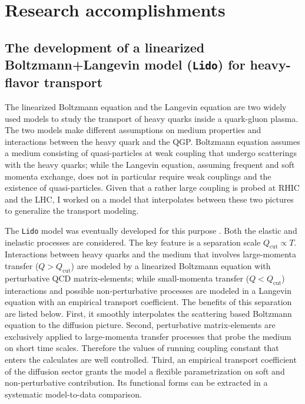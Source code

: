 \documentclass[12pt,a4paper]{article}
\begin{document}
\section{Research accomplishments}
\subsection{The development of a linearized Boltzmann+Langevin model ({\tt Lido}) for heavy-flavor transport}

The linearized Boltzmann equation and the Langevin equation are two widely  used models to study the transport of heavy quarks inside a quark-gluon plasma.
The two models make different assumptions on medium properties and interactions between the heavy quark and the QGP.
Boltzmann equation assumes a medium consisting of quasi-particles at weak coupling that undergo scatterings with the heavy quarks; while the Langevin equation, assuming frequent and soft momenta exchange, does not in particular require weak couplings and the existence of quasi-particles.
Given that a rather large coupling is probed at RHIC and the LHC, I worked on a model that interpolates between these two pictures to generalize the transport modeling.

The {\tt Lido} model was eventually developed for this purpose \cite{Ke:2018tsh, Ke:2018jem}. Both the elastic and inelastic processes are considered.
The key feature is a separation scale $Q_{\textrm{cut}}\propto T$. Interactions between heavy quarks and the medium that involves large-momenta transfer ($Q > Q_{\textrm{cut}}$) are modeled by a linearized Boltzmann equation with perturbative QCD matrix-elements;  while small-momenta transfer ($Q < Q_{\textrm{cut}}$) interactions and possible non-perturbative processes are modeled in a Langevin equation with an empirical transport coefficient. The benefits of this separation are listed below. First, it smoothly interpolates the scattering based Boltzmann equation to the diffusion picture. Second, perturbative matrix-elements are exclusively applied to large-momenta transfer processes that probe the medium on short time scales. Therefore the values of running coupling constant that enters the calculates are well controlled. Third, an empirical transport coefficient of the diffusion sector grants the model a flexible parametrization on soft and non-perturbative contribution. Its functional forms can be extracted in a systematic model-to-data comparison.
\end{document}
